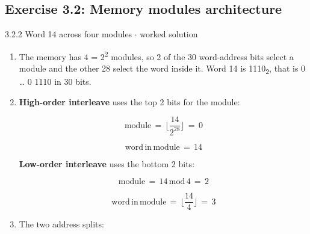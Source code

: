 \documentclass[11pt]{article}
\begin{document}
\begin{keepsection}\subsection{Exercise 3.2: Memory modules architecture}

\begin{workedbox}{3.2.2 Word 14 across four modules \ensuremath{\cdot} worked solution}
\begin{enumerate}
\item The memory has 4 = 2\textsuperscript{2} modules, so 2 of the 30 word-address bits select a module and the other 28 select the word inside it. Word 14 is 1110\textsubscript{2}, that is 0 … 0 1110 in 30 bits.
\item {}
\textbf{High-order interleave} uses the top 2 bits for the module:

\begin{equation*}\text{module}\, =\, ⌊\dfrac{14}{2^{28}}⌋\, =\, 0\end{equation*}

\begin{equation*}\text{word}\, \text{in}\, \text{module}\, =\, 14\end{equation*}

\textbf{Low-order interleave} uses the bottom 2 bits:

\begin{equation*}\text{module}\, =\, 14\, \text{mod}\, 4\, =\, 2\end{equation*}

\begin{equation*}\text{word}\, \text{in}\, \text{module}\, =\, ⌊\dfrac{14}{4}⌋\, =\, 3\end{equation*}
\item {}
The two address splits:


\end{enumerate}
\end{workedbox}
\end{keepsection}
\end{document}
